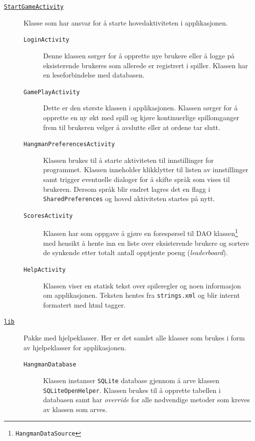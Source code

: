 \begin{description}
\item[\underline{\texttt{StartGameActivity}}] Klasse som har ansvar for å starte hovedaktiviteten i applikasjonen. 

\begin{description}

\item[\texttt{LoginActivity}]
Denne klassen sørger for å opprette nye brukere eller å logge på eksisterende brukeres som allerede er registrert i spiller. Klassen har en leseforbindelse med databasen. 

\item[\texttt{GamePlayActivity}]
Dette er den største klassen i applikasjonen. Klassen sørger for å opprette en ny økt med spill og kjøre kontinuerlige spillomganger frem til brukeren velger å avslutte eller at ordene tar slutt.

\item[\texttt{HangmanPreferencesActivity}]
Klassen brukes til å starte aktiviteten til innstillinger for programmet. Klassen inneholder klikklytter til listen av innstillinger samt trigger eventuelle dialoger for å skifte språk som vises til brukeren. Dersom språk blir endret lagres det en flagg i \texttt{SharedPreferences} og hoved aktiviteten startes på nytt. 

\item[\texttt{ScoresActivity}]
Klassen har som oppgave å gjøre en forespørsel til DAO klassen\footnote{\texttt{HangmanDataSource}} med hensikt å hente inn en liste over eksisterende brukere og sortere de synkende etter totalt antall opptjente poeng (\textit{leaderboard}).

\item[\texttt{HelpActivity}]
Klassen viser en statisk tekst over spileregler og noen informasjon om applikasjonen. Teksten hentes fra \texttt{strings.xml} og blir internt formatert med html tagger. 

\end{description}

\item[\underline{\texttt{lib}}] 
Pakke med hjelpeklasser. Her er det samlet alle klasser som brukes i form av hjelpeklasser for applikasjonen. 
\begin{description}

\item[\texttt{HangmanDatabase}]
Klassen instanser \texttt{SQLite} database gjennom å arve klassen \texttt{SQLiteOpenHelper}. Klassen brukes til å opprette tabellen i databasen samt har \textit{override} for alle nødvendige metoder som kreves av klassen som arves.


\end{description}
\end{description}
